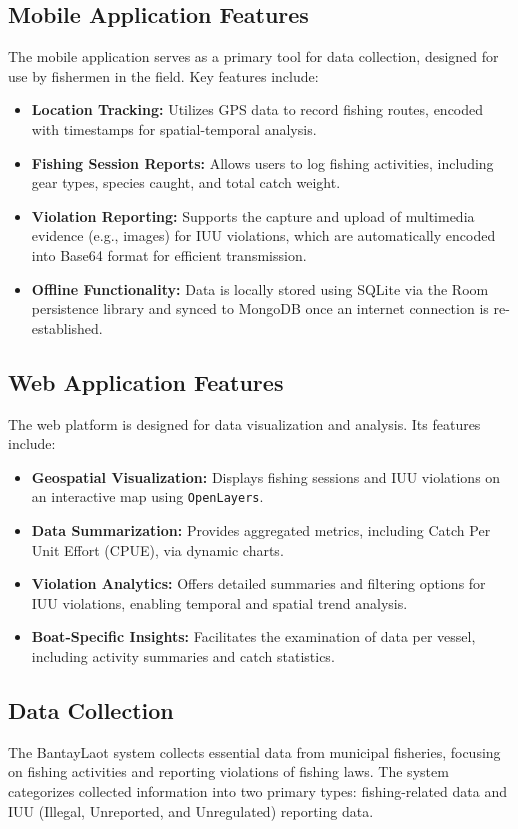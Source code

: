 \documentclass[journal]{IEEEtran}
\begin{document}
\subsection{Mobile Application Features}
The mobile application serves as a primary tool for data collection, designed for use by fishermen in the field. Key features include:
\begin{itemize}
    \item \textbf{Location Tracking:} Utilizes GPS data to record fishing routes, encoded with timestamps for spatial-temporal analysis.
    \item \textbf{Fishing Session Reports:} Allows users to log fishing activities, including gear types, species caught, and total catch weight.
    \item \textbf{Violation Reporting:} Supports the capture and upload of multimedia evidence (e.g., images) for IUU violations, which are automatically encoded into Base64 format for efficient transmission.
    \item \textbf{Offline Functionality:} Data is locally stored using SQLite via the Room persistence library and synced to MongoDB once an internet connection is re-established.
\end{itemize}

\subsection{Web Application Features}
The web platform is designed for data visualization and analysis. Its features include:
\begin{itemize}
    \item \textbf{Geospatial Visualization:} Displays fishing sessions and IUU violations on an interactive map using \texttt{OpenLayers}.
    \item \textbf{Data Summarization:} Provides aggregated metrics, including Catch Per Unit Effort (CPUE), via dynamic charts.
    \item \textbf{Violation Analytics:} Offers detailed summaries and filtering options for IUU violations, enabling temporal and spatial trend analysis.
    \item \textbf{Boat-Specific Insights:} Facilitates the examination of data per vessel, including activity summaries and catch statistics.
\end{itemize}

\subsection{Data Collection}
The BantayLaot system collects essential data from municipal fisheries, focusing on fishing activities and reporting violations of fishing laws. The system categorizes collected information into two primary types: fishing-related data and IUU (Illegal, Unreported, and Unregulated) reporting data.
\end{document}
